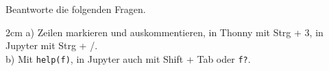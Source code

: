 \question[2]
Beantworte die folgenden Fragen.
\begin{solutionbox}{2cm}
a) Zeilen markieren und auskommentieren, in Thonny mit Strg + 3, in Jupyter mit Strg + /. \\
b) Mit \texttt{help(f)}, in Jupyter auch mit Shift + Tab oder \texttt{f?}.
\end{solutionbox}
